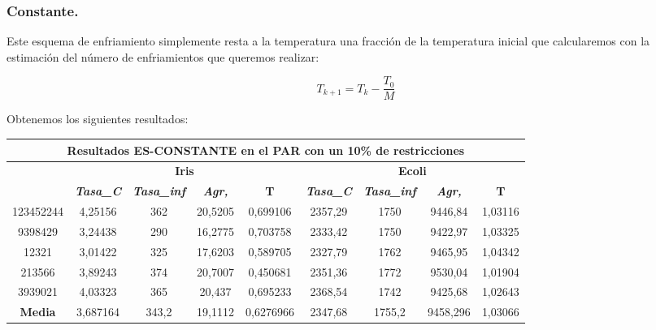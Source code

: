 \documentclass[12pt, spanish]{article}
\begin{document}
\newpage
\subsubsection{Constante.}

Este esquema de enfriamiento simplemente resta a la temperatura una fracción de la temperatura inicial que calcularemos con la estimación del número de enfriamientos que queremos realizar:

$$ T_{k+1} = T_k - \frac{T_0}{M}$$

Obtenemos los siguientes resultados:


\begin{table}[H]
\begin{tabular}{|c|c|c|c|c|c|c|c|c|}
\hline
\multicolumn{9}{|c|}{\textbf{Resultados ES-CONSTANTE en el PAR con un 10\% de restricciones}}                                                                                                                     \\ \hline
\multirow{2}{*}{} & \multicolumn{4}{c|}{\textbf{Iris}}                                                            & \multicolumn{4}{c|}{\textbf{Ecoli}}                                                           \\ \cline{2-9} 
                  & \textit{\textbf{Tasa\_C}} & \textit{\textbf{Tasa\_inf}} & \textit{\textbf{Agr,}} & \textbf{T} & \textit{\textbf{Tasa\_C}} & \textit{\textbf{Tasa\_inf}} & \textit{\textbf{Agr,}} & \textbf{T} \\ \hline
123452244         & 4,25156                   & 362                         & 20,5205                & 0,699106   & 2357,29                   & 1750                        & 9446,84                & 1,03116    \\ \hline
9398429           & 3,24438                   & 290                         & 16,2775                & 0,703758   & 2333,42                   & 1750                        & 9422,97                & 1,03325    \\ \hline
12321             & 3,01422                   & 325                         & 17,6203                & 0,589705   & 2327,79                   & 1762                        & 9465,95                & 1,04342    \\ \hline
213566            & 3,89243                   & 374                         & 20,7007                & 0,450681   & 2351,36                   & 1772                        & 9530,04                & 1,01904    \\ \hline
3939021           & 4,03323                   & 365                         & 20,437                 & 0,695233   & 2368,54                   & 1742                        & 9425,68                & 1,02643    \\ \hline
\textbf{Media}    & 3,687164                  & 343,2                       & 19,1112                & 0,6276966  & 2347,68                   & 1755,2                      & 9458,296               & 1,03066    \\ \hline
\end{tabular}
\end{table}
\end{document}
